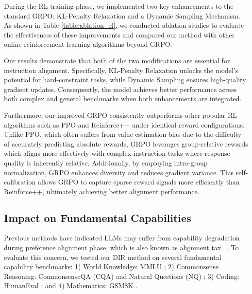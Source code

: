 During the RL training phase, we implemented two key enhancements to the standard GRPO: KL-Penalty Relaxation and a Dynamic Sampling Mechanism. As shown in Table \ref{table:ablation_rl}, we conducted ablation studies to evaluate the effectiveness of these improvements and compared our method with other online reinforcement learning algorithms beyond GRPO.

Our results demonstrate that both of the two modifications are essential for instruction alignment. Specifically, KL-Penalty Relaxation unlocks the model's potential for hard-constraint tasks, while Dynamic Sampling ensures high-quality gradient updates. Consequently, the model achieves better performance across both complex and general benchmarks when both enhancements are integrated.

Furthermore, our improved GRPO consistently outperforms other popular RL algorithms such as PPO \citep{schulman2017proximal} and Reinforce++ \citep{hu2025reinforce++} under identical reward configurations. Unlike PPO, which often suffers from value estimation bias due to the difficulty of accurately predicting absolute rewards, GRPO leverages group-relative rewards which aligns more effectively with complex instruction tasks where response quality is inherently relative. Additionally, by employing intra-group normalization, GRPO enhances diversity and reduces gradient variance. This self-calibration allows GRPO to capture sparse reward signals more efficiently than Reinforce++, ultimately achieving better alignment performance.


\subsection{Impact on Fundamental Capabilities}

Previous methods have indicated LLMs may suffer from capability degradation during preference alignment phase, which is also known as alignment tax ~\citep{ouyang2022training}. To evaluate this concern, we tested our DIR method on several fundamental capability benchmarks: 1) World Knowledge: MMLU \citep{hendrycks2021measuring}; 2) Commonsense Reasoning: CommonsenseQA (CQA) \citep{talmor-etal-2019-commonsenseqa} and Natural Questions (NQ) \citep{kwiatkowski2019natural}; 3) Coding: HumanEval \citep{chen2021evaluatinglargelanguagemodels}; and 4) Mathematics: GSM8K \citep{cobbe2021trainingverifierssolvemath}. 

